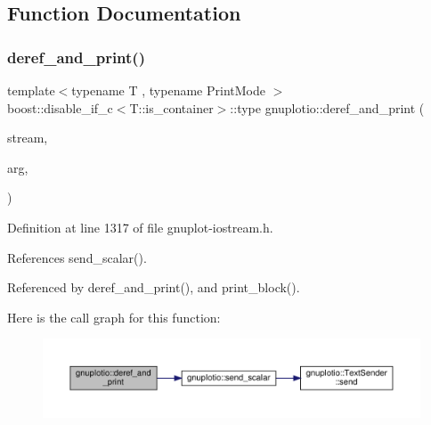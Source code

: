 \subsection{Function Documentation}
\mbox{\label{namespacegnuplotio_a66d64f716e539dc233f8183b4ce71c09}} 
\subsubsection{\texorpdfstring{deref\+\_\+and\+\_\+print()}{deref\_and\_print()}\hspace{0.1cm}{\footnotesize\ttfamily [1/4]}}
{\footnotesize\ttfamily template$<$typename T , typename Print\+Mode $>$ \\
boost\+::disable\+\_\+if\+\_\+c$<$T\+::is\+\_\+container$>$\+::type gnuplotio\+::deref\+\_\+and\+\_\+print (\begin{DoxyParamCaption}\item[{std\+::ostream \&}]{stream,  }\item[{const T \&}]{arg,  }\item[{Print\+Mode}]{ }\end{DoxyParamCaption})}



Definition at line 1317 of file gnuplot-\/iostream.\+h.



References send\+\_\+scalar().



Referenced by deref\+\_\+and\+\_\+print(), and print\+\_\+block().

Here is the call graph for this function\+:\nopagebreak
\begin{figure}[H]
\begin{center}
\leavevmode
\includegraphics[width=350pt]{namespacegnuplotio_a66d64f716e539dc233f8183b4ce71c09_cgraph}
\end{center}
\end{figure}
\mbox{\label{namespacegnuplotio_a8c6b699dd18c419d597a008b74eda41a}} 
